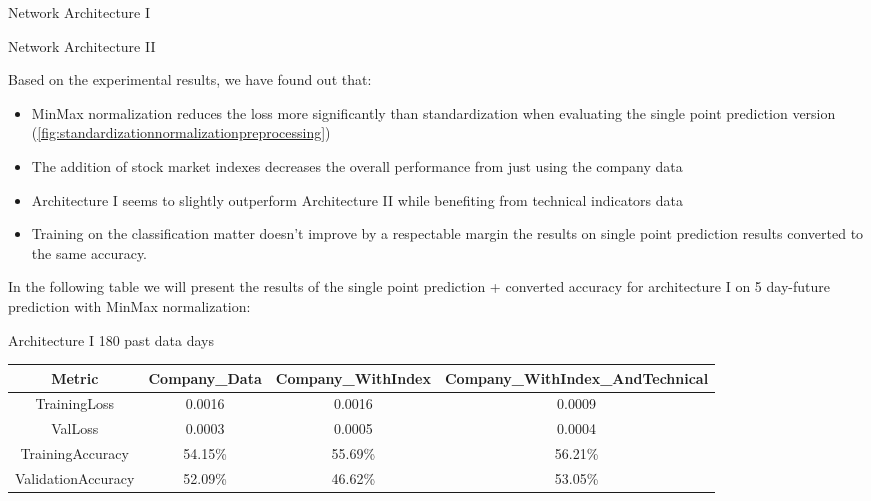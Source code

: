 \begin{algorithm}[H]
\caption{Network Architecture I}
\label{networkarchitectureI}

\end{algorithm}

\begin{algorithm}[H]
\caption{Network Architecture II}
\label{networkarchitectureII}

\end{algorithm}

Based on the experimental results, we have found out that:
\begin{itemize}
    \item MinMax normalization reduces the loss more significantly than standardization when evaluating the single point prediction version (\ref{fig:standardizationnormalizationpreprocessing})
    \item The addition of stock market indexes decreases the overall performance from just using the company data
    \item Architecture I seems to slightly outperform Architecture II while benefiting from technical indicators data
    \item Training on the classification matter doesn't improve by a respectable margin the results on single point prediction results converted to the same accuracy.
\end{itemize}

In the following table we will present the results of the single point prediction + converted accuracy for architecture I on 5 day-future prediction with MinMax normalization: 

\begin{center}
Architecture I 180 past data days
\resizebox{\textwidth}{!} {%
     \begin{tabular}{||c c c c||} 
     \hline
     Metric & Company\_Data & Company\_WithIndex & Company\_WithIndex\_AndTechnical \\
     \hline\hline
     TrainingLoss & 0.0016  & 0.0016  & 0.0009  \\
     \hline
     ValLoss & 0.0003 & 0.0005 & 0.0004 \\
     \hline
     TrainingAccuracy & 54.15\% & 55.69\% & 56.21\% \\
     \hline
     ValidationAccuracy & 52.09\% & 46.62\% & 53.05\% \\
     \hline
    \end{tabular}
}
\end{center}

